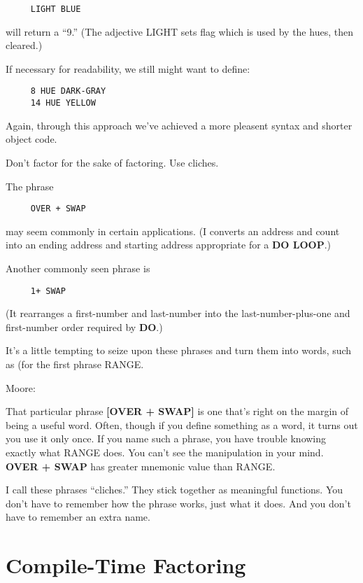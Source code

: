 \begin{verbatim}
     LIGHT BLUE
\end{verbatim}
will return a ``9.'' (The adjective LIGHT sets flag which is used by the hues, then cleared.)

If necessary for readability, we still might want to define:

\begin{verbatim}
     8 HUE DARK-GRAY
     14 HUE YELLOW
\end{verbatim}
Again, through this approach we've achieved a more pleasent syntax and shorter object code.

\begin{tip}
Don't factor for the sake of factoring. Use cliches.
\end{tip}
The phrase

\begin{verbatim}
     OVER + SWAP
\end{verbatim}
may seem commonly in certain applications. (I converts an address and count into an ending address and starting address appropriate for a \textbf{DO LOOP}.)

Another commonly seen phrase is

\begin{verbatim}
     1+ SWAP
\end{verbatim}
(It rearranges a first-number and last-number into the last-number-plus-one and first-number order required by \textbf{DO}.)

It's a little tempting to seize upon these phrases and turn them into words, such as (for the first phrase RANGE.

\bigskip
\blackline{2ex}
\noindent Moore:

\begin{tfquot}
That particular phrase \textbf{[OVER + SWAP]} is one that's right on the margin of being a useful word. Often, though if you define something as a word, it turns out you use it only once. If you name such a phrase, you have trouble knowing exactly what RANGE does. You can't see the manipulation in your mind. \textbf{OVER + SWAP} has greater mnemonic value than RANGE.
\end{tfquot}
\blackline{1ex}
I call these phrases ``cliches.'' They stick together as meaningful functions. You don't have to remember how the phrase works, just what it does. And you don't have to remember an extra name.

\section{{Compile-Time Factoring}}


